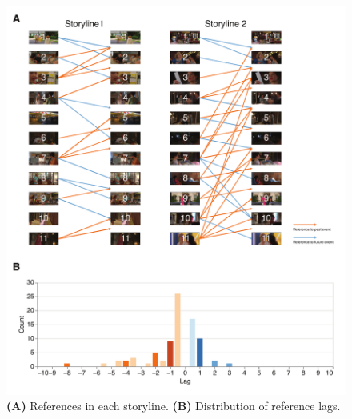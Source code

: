 \documentclass[10pt]{article}
\begin{document}
\begin{figure}[tp]
    \centering
    \includegraphics[width=\textwidth]{supp3.pdf}
    \caption{\textbf{(A)} References in each storyline. \textbf{(B)} Distribution of reference lags.}
    \label{fig:supp3}
\end{figure}
\end{document}
